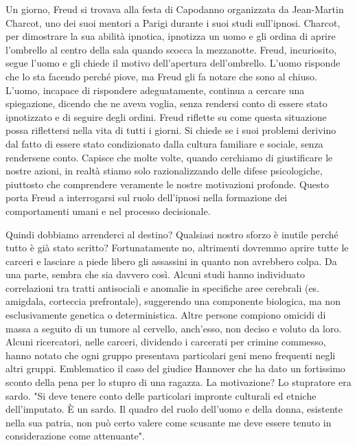\documentclass[12pt]{book} %
\begin{document}
Un giorno, Freud si trovava alla festa di Capodanno organizzata da Jean-Martin Charcot, uno dei suoi mentori a Parigi
durante i suoi studi sull'ipnosi. Charcot, per dimostrare la sua abilità ipnotica, ipnotizza un uomo e gli ordina di
aprire l'ombrello al centro della sala quando scocca la mezzanotte. Freud, incuriosito, segue l'uomo e gli chiede il
motivo dell'apertura dell'ombrello. L'uomo risponde che lo sta facendo perché piove, ma Freud gli fa notare che sono al
chiuso. L'uomo, incapace di rispondere adeguatamente, continua a cercare una spiegazione, dicendo che ne aveva voglia,
senza rendersi conto di essere stato ipnotizzato e di seguire degli ordini. Freud riflette su come questa situazione
possa riflettersi nella vita di tutti i giorni. Si chiede se i suoi problemi derivino dal fatto di essere stato
condizionato dalla cultura familiare e sociale, senza rendersene conto. Capisce che molte volte, quando cerchiamo di
giustificare le nostre azioni, in realtà stiamo solo razionalizzando delle difese psicologiche, piuttosto che
comprendere veramente le nostre motivazioni profonde. Questo porta Freud a interrogarsi sul ruolo dell'ipnosi nella
formazione dei comportamenti umani e nel processo decisionale.

Quindi dobbiamo arrenderci al destino? Qualsiasi nostro sforzo è inutile perché tutto è già stato scritto?
Fortunatamente no, altrimenti dovremmo aprire tutte le carceri e lasciare a piede libero gli assassini in quanto non
avrebbero colpa. Da una parte, sembra che sia davvero così. Alcuni studi hanno individuato correlazioni tra tratti antisociali e anomalie in specifiche aree cerebrali (es. amigdala, corteccia prefrontale), suggerendo una componente biologica, ma non esclusivamente genetica o deterministica. 
Altre persone compiono omicidi di massa a
seguito di un tumore al cervello, anch'esso, non deciso e voluto da loro. Alcuni ricercatori,
nelle carceri, dividendo i carcerati per crimine commesso, hanno notato che ogni gruppo presentava particolari geni
meno frequenti negli altri gruppi. Emblematico il caso del giudice Hannover che ha dato un fortissimo sconto della pena
per lo stupro di una ragazza. La motivazione? Lo stupratore era sardo. "Si deve tenere conto delle
particolari impronte culturali ed etniche dell'imputato. È un sardo. Il quadro del ruolo dell'uomo e della donna,
esistente nella sua patria, non può certo valere come scusante me deve essere tenuto in considerazione come
attenuante".
\end{document}

